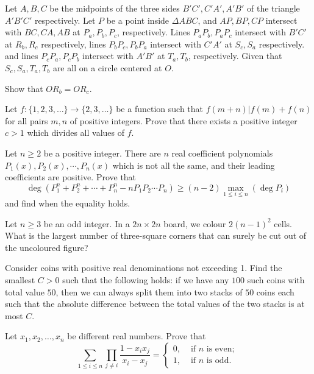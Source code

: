 \documentclass[11pt]{scrartcl}
\begin{document}
\begin{problem}[5261846980754565299]
	Let $A,B,C$ be the midpoints of the three sides $B'C', C'A', A'B'$ of the triangle $A'B'C'$ respectively. Let $P$ be a point inside $\Delta ABC$, and $AP,BP,CP$ intersect with $BC, CA, AB$ at $P_a,P_b,P_c$, respectively. Lines $P_aP_b, P_aP_c$ intersect with $B'C'$ at $R_b, R_c$ respectively, lines $P_bP_c, P_bP_a$ intersect with $C'A'$ at $S_c, S_a$ respectively. and lines $P_cP_a, P_cP_b$ intersect with $A'B'$ at $T_a, T_b$, respectively. Given that $S_c,S_a, T_a, T_b$ are all on a circle centered at $O$.

Show that $OR_b=OR_c$.
\end{problem}
\begin{problem}[208441124738479]
Let $f : \{ 1, 2, 3, \dots \} \to \{ 2, 3, \dots \}$ be a function such that $f(m + n) | f(m) + f(n) $ for all pairs $m,n$ of positive integers. Prove that there exists a positive integer $c > 1$ which divides all values of $f$.
\end{problem}
\begin{problem}[604188725177670]
	Let $n\ge 2$ be a positive integer. There are $n$ real coefficient polynomials $P_1(x),P_2(x),\cdots ,P_n(x)$ which is not all the same, and their leading coefficients are positive. Prove that
$$\deg(P_1^n+P_2^n+\cdots +P_n^n-nP_1P_2\cdots P_n)\ge (n-2)\max_{1\le i\le n}(\deg P_i)$$and find when the equality holds.
\end{problem}
\begin{problem}[6837149463099766937]
	Let $n \ge 3$ be an odd integer. In a $2n \times 2n$ board, we colour $2(n-1)^2$ cells. What is the largest number of three-square corners that can surely be cut out of the uncoloured figure?
\end{problem}
\begin{problem}[46260042068525]
Consider coins with positive real denominations not exceeding 1. Find the smallest $C>0$ such that the following holds: if we have any $100$ such coins with total value $50$, then we can always split them into two stacks of $50$ coins each such that the absolute difference between the total values of the two stacks is at most $C$.
\end{problem}
\begin{problem}[443006607452241]
Let $x_1, x_2, \dots, x_n$ be different real numbers. Prove that
\[\sum_{1 \leqslant i \leqslant n} \prod_{j \neq i} \frac{1-x_{i} x_{j}}{x_{i}-x_{j}}=\left\{\begin{array}{ll}
0, & \text { if } n \text { is even; } \\
1, & \text { if } n \text { is odd. }
\end{array}\right.\]
\end{problem}
\end{document}
